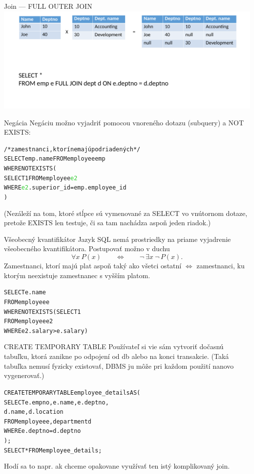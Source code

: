 \documentclass[12pt]{beamer}
\def\blue#1{\textcolor{Cerulean}{#1}}
\def\green#1{\textcolor{LimeGreen}{#1}}
\begin{document}
\begin{frame}{Join --- FULL OUTER JOIN}
\includegraphics[scale=.12]{join5}
\end{frame}

\begin{frame}[fragile]{Negácia}
Negáciu možno vyjadriť pomocou vnoreného dotazu (subquery) a \alert{NOT EXISTS}:
\begin{alltt}
/* zamestnanci, ktorí nemajú podriadených */
SELECT emp.name FROM employee \blue{emp}
WHERE \alert{NOT EXISTS} (
    SELECT 1 FROM employee \green{e2}
    WHERE \green{e2}.superior_id = \blue{emp}.employee_id
)
\end{alltt}
(Nezáleží na tom, ktoré stĺpce sú vymenované za SELECT vo vnútornom dotaze, pretože EXISTS len testuje, či sa tam nachádza aspoň jeden riadok.)
\end{frame}

\begin{frame}[fragile]{Všeobecný kvantifikátor}
Jazyk SQL nemá prostriedky na priame vyjadrenie všeobecného kvantifikátora.
Postupovať možno v duchu
$$
    \forall x\ P(x)\qquad \Leftrightarrow\qquad \lnot\ \exists x\ \lnot\, P(x).
$$
Zamestnanci, ktorí majú plat aspoň taký ako \alert{všetci} ostatní $\Leftrightarrow$ zamestnanci, ku ktorým neexistuje zamestnanec s vyšším platom.
\begin{alltt}
SELECT e.name
FROM employee e
WHERE \blue{NOT EXISTS} (SELECT 1
                  FROM employee e2
                  WHERE e2.salary > e.salary)
\end{alltt}
\end{frame}

\begin{frame}[fragile]{CREATE TEMPORARY TABLE}
Používateľ si vie sám vytvoriť dočasnú tabuľku, ktorá zanikne po odpojení od db alebo na konci transakcie.
(Taká tabuľka nemusí fyzicky existovať, DBMS ju môže pri každom použití nanovo vygenerovať.)
\begin{alltt}
\alert{CREATE TEMPORARY TABLE} \blue{employee_details} AS (
    SELECT e.empno, e.name, e.deptno,
           d.name, d.location
    FROM employee e, department d
    WHERE e.deptno = d.deptno
);
SELECT * FROM \blue{employee_details};
\end{alltt}
Hodí sa to napr. ak chceme opakovane využívať ten istý komplikovaný join.
\end{frame}
\end{document}
